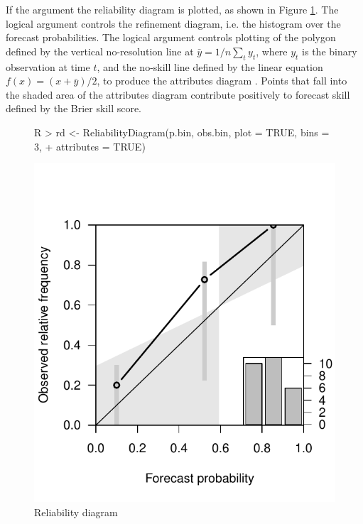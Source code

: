 \documentclass[article]{jss}
\begin{document}
If the argument  the reliability diagram is plotted, as shown in Figure \ref{reldiag-plot}. 
The logical argument  controls the refinement diagram, i.e. the histogram over the forecast probabilities.
The logical argument  controls plotting of the polygon defined by the vertical no-resolution line at $\bar{y} = 1/n \sum_t y_t$, where $y_t$ is the binary observation at time $t$, and the no-skill line defined by the linear equation $f(x)=(x+\bar{y})/2$, to produce the attributes diagram \citep{hsu1986attributes}.
Points that fall into the shaded area of the attributes diagram contribute positively to forecast skill defined by the Brier skill score.

\begin{figure}
\begin{center}
%
\begin{Schunk}
\begin{Sinput}
R > rd <- ReliabilityDiagram(p.bin, obs.bin, plot = TRUE, bins = 3, 
+     attributes = TRUE)
\end{Sinput}
\end{Schunk}
\includegraphics{fig-reldiag}
%
\end{center}
\caption{Reliability diagram}
\label{reldiag-plot}
\end{figure}
\end{document}

